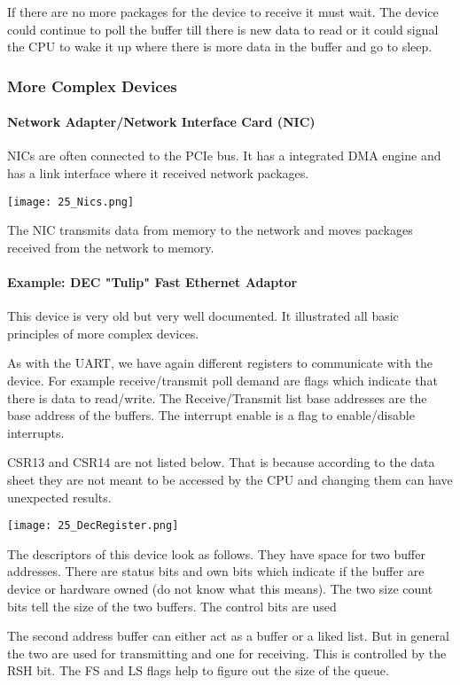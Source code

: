 If there are no more packages for the device to receive it must wait. The device could continue to poll the buffer till there is new data to read or it could signal the CPU to wake it up where there is more data in the buffer and go to sleep.

\subsubsection{More Complex Devices}
\paragraph{Network Adapter/Network Interface Card (NIC)}
NICs are often connected to the PCIe bus. It has a integrated DMA engine and has a link interface where it received network packages.

\texttt{[image: 25\_Nics.png]}

The NIC transmits data from memory to the network and moves packages received from the network to memory.

\paragraph{Example: DEC "Tulip" Fast Ethernet Adaptor}
This device is very old but  very well documented. It illustrated all basic principles of more complex devices.

As with the UART, we have again different registers to communicate with the device. For example receive/transmit poll demand are flags which indicate that there is data to read/write. The Receive/Transmit list base addresses are the base address of the buffers. The interrupt enable is a flag to enable/disable interrupts.

CSR13 and CSR14 are not listed below. That is because according to the data sheet they are not meant to be accessed by the CPU and changing them can have unexpected results.

\texttt{[image: 25\_DecRegister.png]}

The descriptors of this device look as follows. They have space for two buffer addresses. There are status bits and own bits which indicate if the buffer are device or hardware owned (do not know what this means). The two size count bits tell the size of the two buffers. The control bits are used 

The second address buffer can either act as a buffer or a liked list. But in general the two are used for transmitting and one for receiving. This is controlled by the RSH bit. The FS and LS flags help to figure out the size of the queue.

